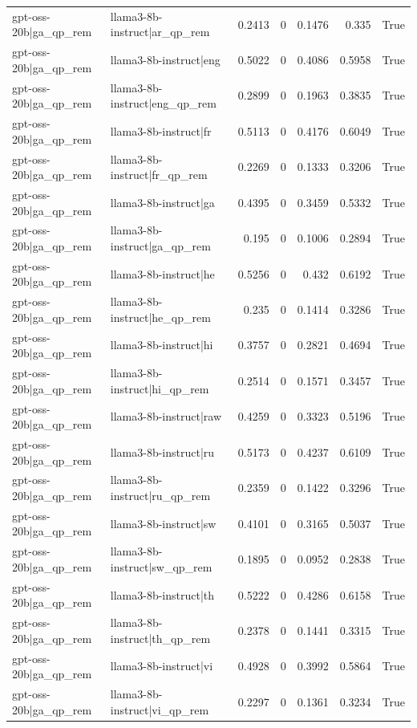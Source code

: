 \begin{table}
\begin{tabular}{l l r r r r l}
gpt-oss-20b|ga_qp_rem & llama3-8b-instruct|ar_qp_rem & 0.2413 & 0 & 0.1476 & 0.335 & True \\
gpt-oss-20b|ga_qp_rem & llama3-8b-instruct|eng & 0.5022 & 0 & 0.4086 & 0.5958 & True \\
gpt-oss-20b|ga_qp_rem & llama3-8b-instruct|eng_qp_rem & 0.2899 & 0 & 0.1963 & 0.3835 & True \\
gpt-oss-20b|ga_qp_rem & llama3-8b-instruct|fr & 0.5113 & 0 & 0.4176 & 0.6049 & True \\
gpt-oss-20b|ga_qp_rem & llama3-8b-instruct|fr_qp_rem & 0.2269 & 0 & 0.1333 & 0.3206 & True \\
gpt-oss-20b|ga_qp_rem & llama3-8b-instruct|ga & 0.4395 & 0 & 0.3459 & 0.5332 & True \\
gpt-oss-20b|ga_qp_rem & llama3-8b-instruct|ga_qp_rem & 0.195 & 0 & 0.1006 & 0.2894 & True \\
gpt-oss-20b|ga_qp_rem & llama3-8b-instruct|he & 0.5256 & 0 & 0.432 & 0.6192 & True \\
gpt-oss-20b|ga_qp_rem & llama3-8b-instruct|he_qp_rem & 0.235 & 0 & 0.1414 & 0.3286 & True \\
gpt-oss-20b|ga_qp_rem & llama3-8b-instruct|hi & 0.3757 & 0 & 0.2821 & 0.4694 & True \\
gpt-oss-20b|ga_qp_rem & llama3-8b-instruct|hi_qp_rem & 0.2514 & 0 & 0.1571 & 0.3457 & True \\
gpt-oss-20b|ga_qp_rem & llama3-8b-instruct|raw & 0.4259 & 0 & 0.3323 & 0.5196 & True \\
gpt-oss-20b|ga_qp_rem & llama3-8b-instruct|ru & 0.5173 & 0 & 0.4237 & 0.6109 & True \\
gpt-oss-20b|ga_qp_rem & llama3-8b-instruct|ru_qp_rem & 0.2359 & 0 & 0.1422 & 0.3296 & True \\
gpt-oss-20b|ga_qp_rem & llama3-8b-instruct|sw & 0.4101 & 0 & 0.3165 & 0.5037 & True \\
gpt-oss-20b|ga_qp_rem & llama3-8b-instruct|sw_qp_rem & 0.1895 & 0 & 0.0952 & 0.2838 & True \\
gpt-oss-20b|ga_qp_rem & llama3-8b-instruct|th & 0.5222 & 0 & 0.4286 & 0.6158 & True \\
gpt-oss-20b|ga_qp_rem & llama3-8b-instruct|th_qp_rem & 0.2378 & 0 & 0.1441 & 0.3315 & True \\
gpt-oss-20b|ga_qp_rem & llama3-8b-instruct|vi & 0.4928 & 0 & 0.3992 & 0.5864 & True \\
gpt-oss-20b|ga_qp_rem & llama3-8b-instruct|vi_qp_rem & 0.2297 & 0 & 0.1361 & 0.3234 & True \\

\end{tabular}
\end{table}
